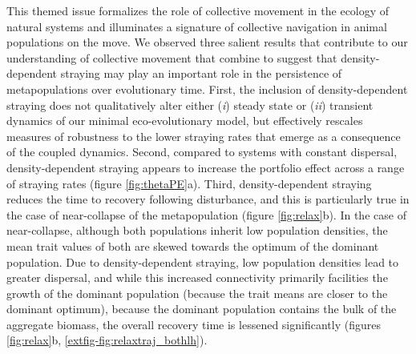 \documentclass{revtex4}
\begin{document}
This themed issue formalizes the role of collective movement in the ecology of natural systems and illuminates a signature of collective navigation in animal populations on the move.
We observed three salient results that contribute to our understanding of collective movement that combine to suggest that density-dependent straying may play an important role in the persistence of metapopulations over evolutionary time.
First, the inclusion of density-dependent straying does not qualitatively alter either (\emph{i}) steady state or (\emph{ii}) transient dynamics of our minimal eco-evolutionary model, but effectively rescales measures of robustness to the lower straying rates that emerge as a consequence of the coupled dynamics.
Second, compared to systems with constant dispersal, density-dependent straying appears to increase the portfolio effect across a range of straying rates (figure \ref{fig:thetaPE}a). 
Third, density-dependent straying reduces the time to recovery following disturbance, and this is particularly true in the case of near-collapse of the metapopulation (figure \ref{fig:relax}b).
In the case of near-collapse, although both populations inherit low population densities, the mean trait values of both are skewed towards the optimum of the dominant population.
Due to density-dependent straying, low population densities lead to greater dispersal, and while this increased connectivity primarily facilities the growth of the dominant population (because the trait means are closer to the dominant optimum), because the dominant population contains the bulk of the aggregate biomass, the overall recovery time is lessened significantly (figures \ref{fig:relax}b, \ref{extfig-fig:relaxtraj_bothlh}).



\end{document}

